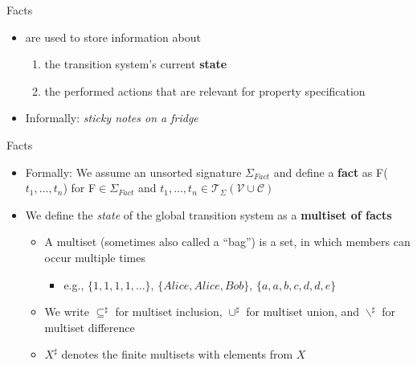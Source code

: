 \documentclass[11pt,aspectratio=169]{beamer}
\begin{document}
\begin{frame}[fragile]{Facts}
    \begin{itemize}
        \item {} are used to store information about
        \begin{enumerate}
            \item the transition system's current \textbf{state}
            \item the performed actions that are relevant for property 
                  specification
        \end{enumerate}
        \item Informally: \textit{sticky notes on a fridge}
        \vspace*{.5cm}
        \begin{figure}
                \hspace*{.4cm}
                \hspace*{.4cm}
                \hspace*{.4cm}
        \end{figure}
    \end{itemize}
\end{frame}

\begin{frame}[fragile]{Facts}
    \begin{itemize}
        \item Formally: We assume an unsorted signature $\Sigma_{Fact}$ and 
              define a \textbf{fact} as F($t_1, \dots, t_n$) for
              F$\in \Sigma_{Fact}$ and $t_1, \dots, t_n \in \mathcal{T}_{\Sigma}
              (\mathcal{V \cup C})$
        \item We define the \textit{state} of the global transition system as a 
              \textbf{multiset of facts}
        \begin{itemize}
            \item A multiset (sometimes also called a ``bag'') is a set, in 
                  which members can occur multiple times
            \begin{itemize}
                \item e.g., $\{1,1,1,1,\dots\}$, $\{Alice, Alice, Bob\}$,
                            $\{a, a, b, c, d, d, e\}$
            \end{itemize}
            \item We write $\subseteq^{\sharp}$ for multiset inclusion,
                  $\cup^{\sharp}$ for multiset union, and
                  $\smallsetminus^{\sharp}$ for multiset difference
            \item $X^{\sharp}$ denotes the finite multisets with elements from 
                  $X$
        \end{itemize}
    \end{itemize}
\end{frame}
\end{document}
